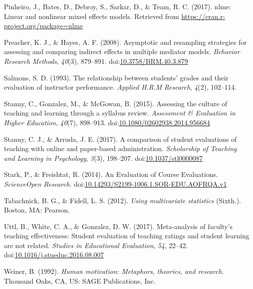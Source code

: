 \documentclass[,man,mask]{apa6}
\begin{document}
\leavevmode\hypertarget{ref-Pinheiro2017}{}%
Pinheiro, J., Bates, D., Debroy, S., Sarkar, D., \& Team, R. C. (2017). nlme: Linear and nonlinear mixed effects models. Retrieved from \url{https://cran.r-project.org/package=nlme}

\leavevmode\hypertarget{ref-Preacher2008}{}%
Preacher, K. J., \& Hayes, A. F. (2008). Asymptotic and resampling strategies for assessing and comparing indirect effects in multiple mediator models. \emph{Behavior Research Methods}, \emph{40}(3), 879--891. doi:\href{https://doi.org/10.3758/BRM.40.3.879}{10.3758/BRM.40.3.879}

\leavevmode\hypertarget{ref-Salmons1993}{}%
Salmons, S. D. (1993). The relationship between students' grades and their evaluation of instructor performance. \emph{Applied H.R.M Research}, \emph{4}(2), 102--114.

\leavevmode\hypertarget{ref-Stanny2015}{}%
Stanny, C., Gonzalez, M., \& McGowan, B. (2015). Assessing the culture of teaching and learning through a syllabus review. \emph{Assessment \& Evaluation in Higher Education}, \emph{40}(7), 898--913. doi:\href{https://doi.org/10.1080/02602938.2014.956684}{10.1080/02602938.2014.956684}

\leavevmode\hypertarget{ref-Stanny2017}{}%
Stanny, C. J., \& Arruda, J. E. (2017). A comparison of student evaluations of teaching with online and paper-based administration. \emph{Scholarship of Teaching and Learning in Psychology}, \emph{3}(3), 198--207. doi:\href{https://doi.org/10.1037/stl0000087}{10.1037/stl0000087}

\leavevmode\hypertarget{ref-Stark2014}{}%
Stark, P., \& Freishtat, R. (2014). An Evaluation of Course Evaluations. \emph{ScienceOpen Research}. doi:\href{https://doi.org/10.14293/S2199-1006.1.SOR-EDU.AOFRQA.v1}{10.14293/S2199-1006.1.SOR-EDU.AOFRQA.v1}

\leavevmode\hypertarget{ref-Tabachnick2012}{}%
Tabachnick, B. G., \& Fidell, L. S. (2012). \emph{Using multivariate statistics} (Sixth.). Boston, MA: Pearson.

\leavevmode\hypertarget{ref-Uttl2017}{}%
Uttl, B., White, C. A., \& Gonzalez, D. W. (2017). Meta-analysis of faculty's teaching effectiveness: Student evaluation of teaching ratings and student learning are not related. \emph{Studies in Educational Evaluation}, \emph{54}, 22--42. doi:\href{https://doi.org/10.1016/j.stueduc.2016.08.007}{10.1016/j.stueduc.2016.08.007}

\leavevmode\hypertarget{ref-Weiner1992}{}%
Weiner, B. (1992). \emph{Human motivation: Metaphors, theories, and research}. Thousand Oaks, CA, US: SAGE Publications, Inc.
\end{document}
